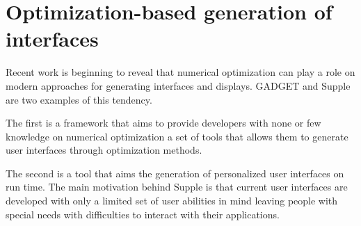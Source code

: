 \section{Optimization-based generation of interfaces}
\label{section:optimization_based_generation_of_interfaces}

Recent work is beginning to reveal that numerical optimization can play a role on modern approaches for generating interfaces and displays. GADGET\cite{gadget} and Supple\cite{supple} are two examples of this tendency.

The first is a framework that aims to provide developers with none or few knowledge on numerical optimization a set of tools that allows them to generate user interfaces through optimization methods.

The second is a tool that aims the generation of personalized user interfaces on run time. The main motivation behind Supple is that current user interfaces are developed with only a limited set of user abilities in mind leaving people with special needs with difficulties to interact with their applications.


